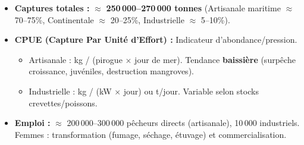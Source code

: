 \documentclass[11pt]{article}
\begin{document}
\begin{aretenir}
\begin{itemize}
    \item \textbf{Captures totales :} $\approx$ \textbf{250\,000--270\,000 tonnes} (Artisanale maritime $\approx$ 70--75\%, Continentale $\approx$ 20--25\%, Industrielle $\approx$ 5--10\%).
    \item \textbf{CPUE (Capture Par Unité d'Effort) :} Indicateur d'abondance/pression.
    \begin{itemize}
        \item Artisanale : kg / (pirogue $\times$ jour de mer). Tendance \textbf{baissière} (surpêche croissance, juvéniles, destruction mangroves).
        \item Industrielle : kg / (kW $\times$ jour) ou t/jour. Variable selon stocks crevettes/poissons.
    \end{itemize}
    \item \textbf{Emploi :} $\approx$ 200\,000--300\,000 pêcheurs directs (artisanale), 10\,000 industriels. Femmes : transformation (fumage, séchage, étuvage) et commercialisation.
\end{itemize}
\end{aretenir}
\end{document}

